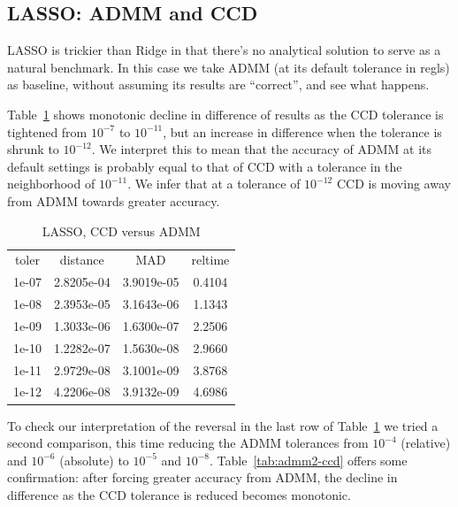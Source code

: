 \documentclass{article}
\begin{document}
\subsection*{LASSO: ADMM and CCD}

LASSO is trickier than Ridge in that there's no analytical solution to
serve as a natural benchmark. In this case we take ADMM (at its
default tolerance in \textsf{regls}) as baseline, without assuming its
results are ``correct'', and see what happens.

Table~\ref{tab:admm-ccd} shows monotonic decline in difference of
results as the CCD tolerance is tightened from $10^{-7}$ to
$10^{-11}$, but an increase in difference when the tolerance is shrunk
to $10^{-12}$. We interpret this to mean that the accuracy of ADMM at
its default settings is probably equal to that of CCD with a tolerance
in the neighborhood of $10^{-11}$. We infer that at a tolerance of
$10^{-12}$ CCD is moving away from ADMM towards greater accuracy.


\begin{table}[htbp]
\begin{center}
\begin{tabular}{cccc}
toler & distance & MAD & reltime \\[4pt]
1e-07 & 2.8205e-04 & 3.9019e-05 & 0.4104 \\
1e-08 & 2.3953e-05 & 3.1643e-06 & 1.1343 \\
1e-09 & 1.3033e-06 & 1.6300e-07 & 2.2506 \\
1e-10 & 1.2282e-07 & 1.5630e-08 & 2.9660 \\
1e-11 & 2.9729e-08 & 3.1001e-09 & 3.8768 \\
1e-12 & 4.2206e-08 & 3.9132e-09 & 4.6986 \\
\end{tabular}
\caption{LASSO, CCD versus ADMM}
\label{tab:admm-ccd}
\end{center}
\end{table}

To check our interpretation of the reversal in the last row of
Table~\ref{tab:admm-ccd} we tried a second comparison, this time
reducing the ADMM tolerances from $10^{-4}$ (relative) and $10^{-6}$
(absolute) to $10^{-5}$ and $10^{-8}$. Table~\ref{tab:admm2-ccd}
offers some confirmation: after forcing greater accuracy from ADMM,
the decline in difference as the CCD tolerance is reduced becomes
monotonic.
\end{document}
